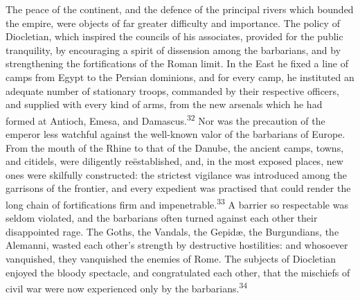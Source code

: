The peace of the continent, and the defence of the principal
rivers which bounded the empire, were objects of far greater
difficulty and importance. The policy of Diocletian, which
inspired the councils of his associates, provided for the public
tranquility, by encouraging a spirit of dissension among the
barbarians, and by strengthening the fortifications of the Roman
limit. In the East he fixed a line of camps from Egypt to the
Persian dominions, and for every camp, he instituted an adequate
number of stationary troops, commanded by their respective
officers, and supplied with every kind of arms, from the new
arsenals which he had formed at Antioch, Emesa, and Damascus.\textsuperscript{32}
Nor was the precaution of the emperor less watchful against the
well-known valor of the barbarians of Europe. From the mouth of
the Rhine to that of the Danube, the ancient camps, towns, and
citidels, were diligently reëstablished, and, in the most exposed
places, new ones were skilfully constructed: the strictest
vigilance was introduced among the garrisons of the frontier, and
every expedient was practised that could render the long chain of
fortifications firm and impenetrable.\textsuperscript{33} A barrier so respectable
was seldom violated, and the barbarians often turned against each
other their disappointed rage. The Goths, the Vandals, the
Gepidæ, the Burgundians, the Alemanni, wasted each other’s
strength by destructive hostilities: and whosoever vanquished,
they vanquished the enemies of Rome. The subjects of Diocletian
enjoyed the bloody spectacle, and congratulated each other, that
the mischiefs of civil war were now experienced only by the
barbarians.\textsuperscript{34}




